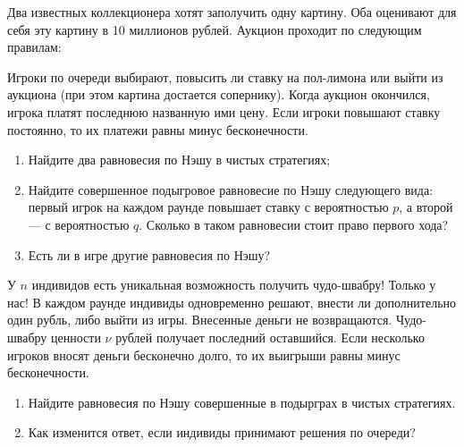 \begin{problem}\par
\begin{source} \cite{cramton:lectures}\end{source}
Два известных коллекционера хотят заполучить одну картину. Оба оценивают для себя эту картину в 10 миллионов рублей. Аукцион проходит по следующим правилам:\par
Игроки по очереди выбирают, повысить ли ставку на пол-лимона или выйти из аукциона (при этом картина достается сопернику). Когда аукцион окончился,  игрока платят последнюю названную ими цену. Если игроки повышают ставку постоянно, то их платежи равны минус бесконечности.
\begin{enumerate}
\item Найдите два равновесия по Нэшу в чистых стратегиях;\par
\item Найдите совершенное подыгровое равновесие по Нэшу следующего вида: первый игрок на каждом раунде повышает ставку с вероятностью  $p$, а второй --- с вероятностью  $q$. Сколько в таком равновесии стоит право первого хода?\par
\item  Есть ли в игре другие равновесия по Нэшу?
\end{enumerate}

\begin{sol}

\end{sol}
\end{problem}




\begin{problem}[<<Лохотрон>>]
У  $n$  индивидов есть уникальная возможность получить чудо-швабру! Только у нас! В каждом раунде индивиды одновременно решают, внести ли дополнительно один рубль, либо выйти из игры. Внесенные деньги не возвращаются. Чудо-швабру ценности  $\nu $  рублей получает последний оставшийся. Если несколько игроков вносят деньги бесконечно долго, то их выигрыши равны минус бесконечности.\par
\begin{enumerate}
\item Найдите равновесия по Нэшу совершенные в подырграх в чистых стратегиях.\par
\item Как изменится ответ, если индивиды принимают решения по очереди?\par
\end{enumerate}


\begin{sol}

\end{sol}
\end{problem}




